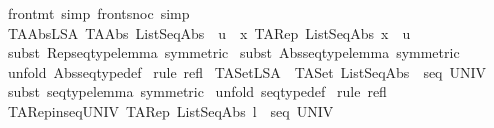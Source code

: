\begin{isabellebody}
\isamarkupfalse%
\ front{\isacharunderscore}mt\ {\isacharbrackleft}simp{\isacharbrackright}\ front{\isacharunderscore}snoc\ {\isacharbrackleft}simp{\isacharbrackright}\isanewline
\isanewline
\isanewline
\isanewline
\isanewline
\isanewline
\isanewline
\isanewline
\isanewline
\isanewline
\isanewline
\isanewline
\isanewline
\isanewline
\isanewline
\isanewline
\isanewline
\isanewline
\isanewline
{}\isamarkupfalse%
\ TAAbs{\isacharunderscore}LSA{\isacharcolon}\ {\isachardoublequoteopen}TAAbs\ ListSeqAbs\ {\isacharequal}\ {\isacharparenleft}{\isacharpercent}u{\isachardot}\ {\isacharat}\ x{\isachardot}\ {\isacharparenleft}TARep\ ListSeqAbs{\isacharparenright}\ x\ {\isacharequal}\ u{\isacharparenright}{\isachardoublequoteclose}\isanewline
%
\isadelimproof
%
\endisadelimproof
%
\isatagproof
{}\isamarkupfalse%
\ {\isacharparenleft}subst\ Rep{\isacharunderscore}seqtype{\isacharunderscore}lemma\ {\isacharbrackleft}symmetric{\isacharbrackright}{\isacharparenright}\isanewline
{}\isamarkupfalse%
\ {\isacharparenleft}subst\ Abs{\isacharunderscore}seqtype{\isacharunderscore}lemma\ {\isacharbrackleft}symmetric{\isacharbrackright}{\isacharparenright}\isanewline
{}\isamarkupfalse%
\ {\isacharparenleft}unfold\ Abs{\isacharunderscore}seqtype{\isacharunderscore}def{\isacharparenright}\isanewline
{}\isamarkupfalse%
\ {\isacharparenleft}rule\ refl{\isacharparenright}\isanewline
{}\isamarkupfalse%
%
\endisatagproof
{\isafoldproof}%
%
\isadelimproof
\isanewline
%
\endisadelimproof
\isanewline
{}\isamarkupfalse%
\ TASet{\isacharunderscore}LSA{\isacharcolon}\ \ {\isachardoublequoteopen}TASet\ ListSeqAbs\ {\isacharequal}\ seq\ UNIV{\isachardoublequoteclose}\isanewline
%
\isadelimproof
%
\endisadelimproof
%
\isatagproof
{}\isamarkupfalse%
\ {\isacharparenleft}subst\ seqtype{\isacharunderscore}lemma\ {\isacharbrackleft}symmetric{\isacharbrackright}{\isacharparenright}\isanewline
{}\isamarkupfalse%
\ {\isacharparenleft}unfold\ seqtype{\isacharunderscore}def{\isacharparenright}\isanewline
{}\isamarkupfalse%
\ {\isacharparenleft}rule\ refl{\isacharparenright}\isanewline
{}\isamarkupfalse%
%
\endisatagproof
{\isafoldproof}%
%
\isadelimproof
\isanewline
%
\endisadelimproof
\isanewline
{}\isamarkupfalse%
\ TARep{\isacharunderscore}in{\isacharunderscore}seqUNIV{\isacharcolon}\ {\isachardoublequoteopen}TARep\ ListSeqAbs\ l\ {\isacharcolon}\ seq\ UNIV{\isachardoublequoteclose}\isanewline

\end{isabellebody}
